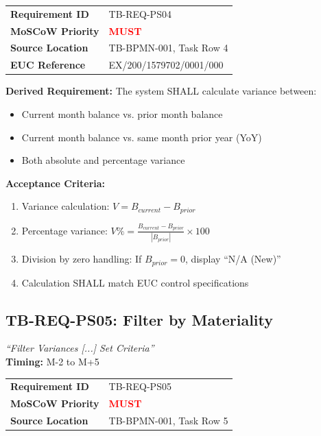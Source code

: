\begin{tabularx}{\textwidth}{@{}lX@{}}
\toprule
\textbf{Requirement ID} & TB-REQ-PS04 \\
\textbf{MoSCoW Priority} & \textcolor{red}{\textbf{MUST}} \\
\textbf{Source Location} & TB-BPMN-001, Task Row 4 \\
\textbf{EUC Reference} & EX/200/1579702/0001/000 \\
\bottomrule
\end{tabularx}

\textbf{Derived Requirement:} The system SHALL calculate variance between:
\begin{itemize}
    \item Current month balance vs. prior month balance
    \item Current month balance vs. same month prior year (YoY)
    \item Both absolute and percentage variance
\end{itemize}

\textbf{Acceptance Criteria:}
\begin{enumerate}[label=AC-PS04-\arabic*:]
    \item Variance calculation: $V = B_{current} - B_{prior}$
    \item Percentage variance: $V\% = \frac{B_{current} - B_{prior}}{|B_{prior}|} \times 100$
    \item Division by zero handling: If $B_{prior} = 0$, display ``N/A (New)''
    \item Calculation SHALL match EUC control specifications
\end{enumerate}

\subsection{TB-REQ-PS05: Filter by Materiality}
\label{req:tb-req-ps05}

\begin{tcolorbox}[colback=sourcegreen!5,colframe=sourcegreen!70,title=BPMN Task Extract]
\textit{``Filter Variances [...] Set Criteria''}\\
\textbf{Timing:} M-2 to M+5
\end{tcolorbox}

\begin{tabularx}{\textwidth}{@{}lX@{}}
\toprule
\textbf{Requirement ID} & TB-REQ-PS05 \\
\textbf{MoSCoW Priority} & \textcolor{red}{\textbf{MUST}} \\
\textbf{Source Location} & TB-BPMN-001, Task Row 5 \\
\bottomrule
\end{tabularx}

